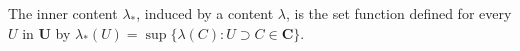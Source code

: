 The inner content $\lambda_*$, induced by a content $\lambda$, is the set function defined for every $U$ in $\mathbf{U}$ by $\lambda_*(U) = \sup \{\lambda(C): U \supset C \in \mathbf{C}\}$.

